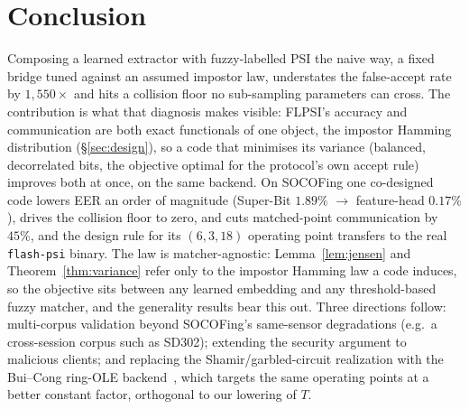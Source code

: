 \section{Conclusion}
\label{sec:conclusion}

Composing a learned extractor with fuzzy-labelled PSI the naive way, a fixed bridge tuned against an
assumed impostor law, understates the false-accept rate by $1{,}550\times$ and hits a collision floor
no sub-sampling parameters can cross. The contribution is what that diagnosis makes visible: FLPSI's
accuracy and communication are both exact functionals of one object, the impostor Hamming distribution
(\S\ref{sec:design}), so a code that minimises its variance (balanced, decorrelated bits, the objective
optimal for the protocol's own accept rule) improves both at once, on the same backend. On SOCOFing one
co-designed code lowers EER an order of magnitude (Super-Bit $1.89\%$ $\to$ feature-head $0.17\%$),
drives the collision floor to zero, and cuts matched-point communication by $45\%$, and the design rule
for its $(6,3,18)$ operating point transfers to the real \texttt{flash-psi} binary. The law is
matcher-agnostic: Lemma~\ref{lem:jensen} and Theorem~\ref{thm:variance} refer only to the impostor
Hamming law a code induces, so the objective sits between any learned embedding and any threshold-based
fuzzy matcher, and the generality results bear this out. Three directions follow: multi-corpus
validation beyond SOCOFing's same-sensor degradations (e.g.\ a cross-session corpus such as SD302);
extending the security argument to malicious clients; and replacing the Shamir/garbled-circuit
realization with the Bui--Cong ring-OLE backend~\cite{BuiCong25}, which targets the same operating
points at a better constant factor, orthogonal to our lowering of $T$.

